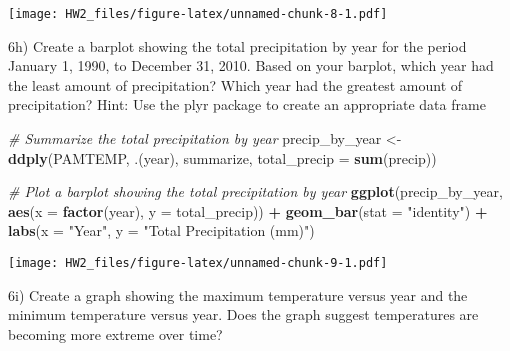 \documentclass[
]{article}
\newenvironment{Shaded}{\begin{snugshade}}{\end{snugshade}}
\newcommand{\AttributeTok}[1]{\textcolor[rgb]{0.13,0.29,0.53}{#1}}
\newcommand{\CommentTok}[1]{\textcolor[rgb]{0.56,0.35,0.01}{\textit{#1}}}
\newcommand{\FunctionTok}[1]{\textcolor[rgb]{0.13,0.29,0.53}{\textbf{#1}}}
\newcommand{\NormalTok}[1]{#1}
\newcommand{\OtherTok}[1]{\textcolor[rgb]{0.56,0.35,0.01}{#1}}
\newcommand{\SpecialCharTok}[1]{\textcolor[rgb]{0.81,0.36,0.00}{\textbf{#1}}}
\newcommand{\StringTok}[1]{\textcolor[rgb]{0.31,0.60,0.02}{#1}}
\begin{document}
\texttt{[image: HW2\_files/figure-latex/unnamed-chunk-8-1.pdf]}

6h) Create a barplot showing the total precipitation by year for the
period January 1, 1990, to December 31, 2010. Based on your barplot,
which year had the least amount of precipitation? Which year had the
greatest amount of precipitation? Hint: Use the plyr package to create
an appropriate data frame

\begin{Shaded}
\begin{Highlighting}[]
\CommentTok{\# Summarize the total precipitation by year}
\NormalTok{precip\_by\_year }\OtherTok{\textless{}{-}} \FunctionTok{ddply}\NormalTok{(PAMTEMP, .(year), summarize, }\AttributeTok{total\_precip =} \FunctionTok{sum}\NormalTok{(precip))}

\CommentTok{\# Plot a barplot showing the total precipitation by year}
\FunctionTok{ggplot}\NormalTok{(precip\_by\_year, }\FunctionTok{aes}\NormalTok{(}\AttributeTok{x =} \FunctionTok{factor}\NormalTok{(year), }\AttributeTok{y =}\NormalTok{ total\_precip)) }\SpecialCharTok{+}
  \FunctionTok{geom\_bar}\NormalTok{(}\AttributeTok{stat =} \StringTok{"identity"}\NormalTok{) }\SpecialCharTok{+}
  \FunctionTok{labs}\NormalTok{(}\AttributeTok{x =} \StringTok{"Year"}\NormalTok{, }\AttributeTok{y =} \StringTok{"Total Precipitation (mm)"}\NormalTok{)}
\end{Highlighting}
\end{Shaded}

\texttt{[image: HW2\_files/figure-latex/unnamed-chunk-9-1.pdf]}

6i) Create a graph showing the maximum temperature versus year and the
minimum temperature versus year. Does the graph suggest temperatures are
becoming more extreme over time?
\end{document}
